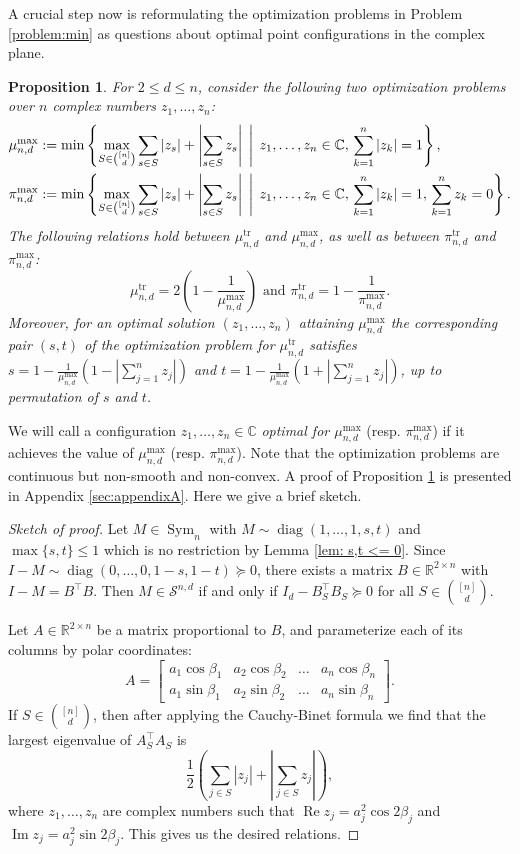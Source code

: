 \documentclass[reqno,hidelinks,11pt]{amsart}
\numberwithin{equation}{section}
\newtheorem{proposition}[theorem]{Proposition}
\def\RR{\mathbb{R}}
\def\CC{\mathbb{C}}
\def\b{\beta}
\def\diag{\operatorname{diag}}
\def\S{\mathcal{S}}
\def\Sym{\operatorname{Sym}}
\def\Re{\operatorname{Re}}
\def\Im{\operatorname{Im}}
\def\tr{\operatorname{tr}}
\newcommand{\suchthat}{\;\ifnum\currentgrouptype=16 \middle\fi|\;}
\begin{document}
A crucial step now is reformulating the optimization problems in Problem \ref{problem:min} as questions about optimal point configurations in the complex plane.

\begin{proposition}\label{prop: equivalences}
For $2 \leq d \leq n$, consider the following two optimization problems over $n$ complex numbers $z_1,\dots,z_n$:
    \begin{align*}
    \mu_{n,d}^{\max}  & :=   \min\left\{\max_{S\in\binom{[n]}d}\sum_{s\in S}|z_s|+\left|\sum_{s\in S} z_s\right|\,\suchthat\,z_1,\dots,z_n\in\CC,\, \sum_{k=1}^n|z_k|=1\right\}, \\
    \pi_{n,d}^{\max} & :=  
    \min\left\{\max_{S\in\binom{[n]}d}\sum_{s\in S}|z_s|+\left|\sum_{s\in S} z_s\right|\,\suchthat\,z_1,\dots,z_n\in\CC,\, \sum_{k=1}^n|z_k|=1,\, \sum_{k=1}^n z_k=0\right\}.    
    \end{align*} 
    The following relations hold between $\mu_{n,d}^{\tr}$ and $ \mu_{n,d}^{\max}$, as well as between $\pi_{n,d}^{\tr}$ and $ \pi_{n,d}^{\max}$: 
    \[ \mu_{n,d}^{\tr} = 2 \left( 1- \frac{1}{\mu_{n,d}^{\max}}\right) \text{ and } \pi_{n,d}^{\tr} = 1- \frac{1}{\pi_{n,d}^{\max}}.\]
    Moreover, for an optimal solution $(z_1,\dots,z_n)$ attaining $\mu_{n,d}^{\max}$ the corresponding pair $(s,t)$ of the optimization problem for $\mu_{n,d}^{\operatorname{tr}}$ satisfies $s=1-\frac{1}{\mu_{n,d}^{\max}}(1-|\sum_{j=1}^n z_j|)$ and $t=1-\frac{1}{\mu_{n,d}^{\max}}(1+|\sum_{j=1}^n z_j|)$, up to permutation of $s$ and $t$.
\end{proposition}
We will call a configuration $z_1, \ldots, z_n \in \CC$ \emph{optimal for $\mu_{n, d}^{\max}$} (resp.  $\pi_{n, d}^{\max}$) if it achieves the value of $\mu_{n, d}^{\max}$ (resp.  $\pi_{n, d}^{\max}$). Note that the optimization problems are continuous but non-smooth and non-convex. A proof of Proposition \ref{prop: equivalences} is presented in Appendix \ref{sec:appendixA}. Here we give a brief sketch.

\begin{proof}[Sketch of proof]
Let $M \in \Sym_n$ with $M \sim \diag (1,\ldots,1,s,t)$ and $\max\{s,t\} \leq 1$ which is no restriction by Lemma \ref{lem: s,t <= 0}. Since $I-M \sim \diag(0,\ldots,0,1-s,1-t) \succeq 0$, there exists a matrix $B \in \RR^{2 \times n}$ with $I-M=B^\top B$. Then $M \in \S^{n,d}$ if and only if $I_d-B_S^\top B_S \succeq 0$ for all $S \in \binom{[n]}{d}$.

Let $A \in \RR^{2 \times n}$ be a matrix proportional to $B$, and parameterize each of its columns by polar coordinates:
\[
A=\begin{bmatrix}
a_1\cos\b_1 & a_2\cos\b_2 & \dots & a_n\cos\b_n\\
a_1\sin\b_1 & a_2\sin\b_2 & \dots & a_n\sin\b_n
\end{bmatrix}.
\]
If $S \in \binom{[n]}{d}$, then after applying the Cauchy-Binet formula we find that the largest eigenvalue of $A_S^\top A_S$ is
\[
\frac12\left(\sum_{j\in S}|z_j|+\left|\sum_{j\in S} z_j\right|\right),
\] 
where $z_1,\dots,z_n$ are complex numbers such that $\Re z_j = a_j^2\cos 2\beta_j$ and $\Im z_j = a_j^2\sin 2\beta_j$. This gives us the desired relations.
\end{proof}
\end{document}
